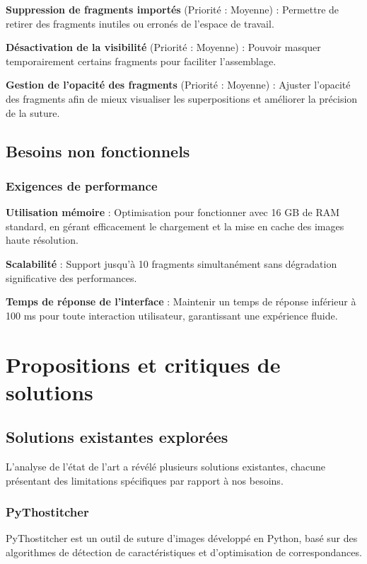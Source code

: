 \documentclass[12pt,a4paper]{report}
\begin{document}
\textbf{Suppression de fragments importés} (Priorité : Moyenne) : Permettre de retirer des fragments inutiles ou erronés de l'espace de travail.

\textbf{Désactivation de la visibilité} (Priorité : Moyenne) : Pouvoir masquer temporairement certains fragments pour faciliter l'assemblage.

\textbf{Gestion de l'opacité des fragments} (Priorité : Moyenne) : Ajuster l'opacité des fragments afin de mieux visualiser les superpositions et améliorer la précision de la suture.

\subsection{Besoins non fonctionnels}

\subsubsection{Exigences de performance}

\textbf{Utilisation mémoire} : Optimisation pour fonctionner avec 16 GB de RAM standard, en gérant efficacement le chargement et la mise en cache des images haute résolution.

\textbf{Scalabilité} : Support jusqu'à 10 fragments simultanément sans dégradation significative des performances.

\textbf{Temps de réponse de l'interface} : Maintenir un temps de réponse inférieur à 100 ms pour toute interaction utilisateur, garantissant une expérience fluide.

\section{Propositions et critiques de solutions}

\subsection{Solutions existantes explorées}

L'analyse de l'état de l'art a révélé plusieurs solutions existantes, chacune présentant des limitations spécifiques par rapport à nos besoins.

\subsubsection{PyThostitcher}

PyThostitcher est un outil de suture d'images développé en Python, basé sur des algorithmes de détection de caractéristiques et d'optimisation de correspondances.
\end{document}
